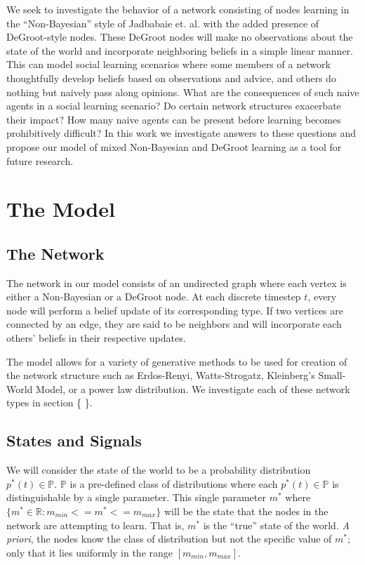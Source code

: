 \documentclass[a4paper,12pt]{article}
\begin{document}
We seek to investigate the behavior of a network consisting of nodes learning in the ``Non-Bayesian'' style of Jadbabaie et. al. with the added presence of DeGroot-style nodes.  These DeGroot nodes will make no observations about the state of the world and incorporate neighboring beliefs in a simple linear manner.  This can model social learning scenarios where some members of a network thoughtfully develop beliefs based on observations and advice, and others do nothing but naively pass along opinions.  What are the consequences of such naive agents in a social learning scenario?  Do certain network structures exacerbate their impact?  How many naive agents can be present before learning becomes prohibitively difficult?  In this work we investigate answers to these questions and propose our model of mixed Non-Bayesian and DeGroot learning as a tool for future research.

\section{The Model}

\subsection{The Network}

The network in our model consists of an undirected graph where each vertex is either a Non-Bayesian or a DeGroot node.  At each discrete timestep $t$, every node will perform a belief update of its corresponding type.  If two vertices are connected by an edge, they are said to be neighbors and will incorporate each others' beliefs in their respective updates.

The model allows for a variety of generative methods to be used for creation of the network structure such as Erdos-Renyi, Watts-Strogatz, Kleinberg's Small-World Model, or a power law distribution.  We investigate each of these network types in section \{ \}.%

\subsection{States and Signals}

We will consider the state of the world to be a probability distribution $p^*(t) \in \mathbb{P}$.  $\mathbb{P}$ is a pre-defined class of distributions where each  $p^*(t) \in \mathbb{P}$ is distinguishable by a single parameter.  This single parameter $m^*$ where $\{m^* \in \mathbb{R}: m_{min} <= m^* <= m_{max} \}$  will be the state that the nodes in the network are attempting to learn.  That is, $m^*$ is the ``true'' state of the world.  \emph{A priori}, the nodes know the class of distribution but not the specific value of $m^*$; only that it lies uniformly in the range $[m_{min}, m_{max}]$.
\end{document}
